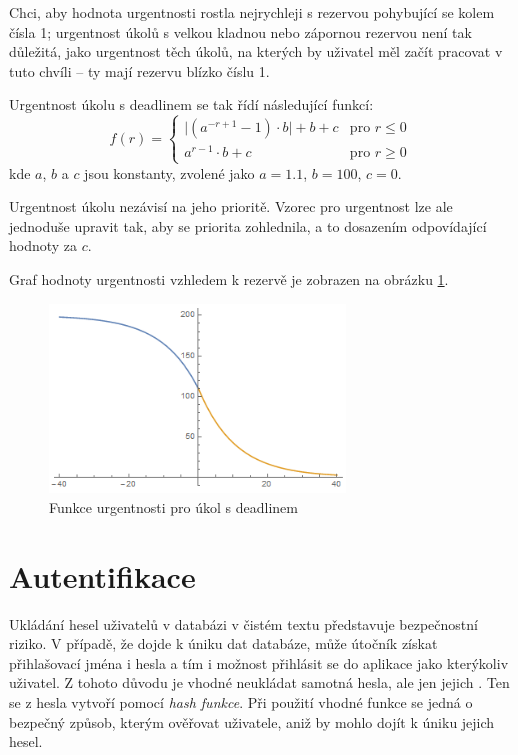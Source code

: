 \documentclass[thesis=B,czech]{FITthesis}[2012/06/26]
\begin{document}
			Chci, aby hodnota urgentnosti rostla nejrychleji s rezervou pohybující se kolem čísla 1; urgentnost úkolů s velkou kladnou nebo zápornou rezervou není tak důležitá, jako urgentnost těch úkolů, na kterých by uživatel měl začít pracovat v tuto chvíli -- ty mají rezervu blízko číslu 1. 
			
			Urgentnost úkolu s deadlinem se tak řídí následující funkcí:
				\begin{equation}
				f(r)=
				\begin{cases}
					\lvert(a^{-r+1}-1)\cdot b \rvert +b+c& \text{pro } r\leq 0 \\
					a^{r-1}\cdot b + c& \text{pro } r\geq 0
				\end{cases}
				\end{equation}
			kde $a$, $b$ a $c$ jsou konstanty, zvolené jako $a=1.1$, $b=100$, $c=0$.

			Urgentnost úkolu nezávisí na jeho prioritě. Vzorec pro urgentnost lze ale jednoduše upravit tak, aby se priorita zohlednila, a to dosazením odpovídající hodnoty za $c$.
			
			Graf hodnoty urgentnosti vzhledem k rezervě je zobrazen na obrázku \ref{urgency-plot}.
			
			\begin{figure}\centering
				\includegraphics[width=0.7\textwidth]{resources/urgency-plot.png}
				\caption[Urgentnost úkolu s deadlinem]{Funkce urgentnosti pro úkol s deadlinem}
				\label{urgency-plot}
			\end{figure}
			


	
	\section{Autentifikace}
		Ukládání hesel uživatelů v databázi v čistém textu představuje bezpečnostní riziko. V případě, že dojde k úniku dat databáze, může útočník získat přihlašovací jména i hesla a tím i možnost přihlásit se do aplikace jako kterýkoliv uživatel. Z tohoto důvodu je vhodné neukládat samotná hesla, ale jen jejich . Ten se z hesla vytvoří pomocí \textit{hash funkce}. \cite{hash-function} Při použití vhodné funkce se jedná o bezpečný způsob, kterým ověřovat uživatele, aniž by mohlo dojít k úniku jejich hesel.
		
\end{document}
